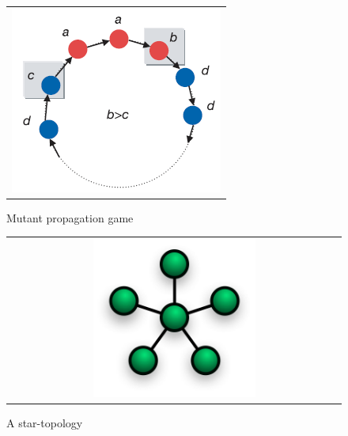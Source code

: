 \begin{figure}
\centering
\begin{tabular}{@{}c@{}}
\includegraphics[width=1.0\textwidth]{natureGameSingle.png}
\end{tabular}
\caption{\label{fig:game} Mutant propagation game}
\end{figure}


\begin{figure}
\centering
\begin{tabular}{@{}c@{}}
\includegraphics[width=0.5\textwidth]{NetworkTopology-Star.png}
\end{tabular}
\caption{\label{fig:star} A star-topology}
\end{figure}



